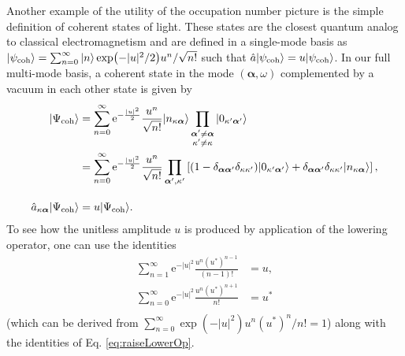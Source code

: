 \documentclass{article}
\numberwithin{equation}{section}
\begin{document}
Another example of the utility of the occupation number picture is the simple definition of coherent states of light. These states are the closest quantum analog to classical electromagnetism and are defined in a single-mode basis as $|{\psi_\mathrm{coh}}\rangle = \sum_{n = 0}^\infty|{n}\rangle\exp(-|u|^2/2)u^n/\sqrt{n!}$ such that $\hat{a}|{\psi_\mathrm{coh}}\rangle = u|{\psi_\mathrm{coh}}\rangle$. In our full multi-mode basis, a coherent state in the mode $(\bm{\alpha},\omega)$ complemented by a vacuum in each other state is given by
\begin{equation}
\begin{split}
|{\Psi_\mathrm{coh}}\rangle &= \sum_{n = 0}^\infty \mathrm{e}^{-\frac{|u|^2}{2}}\frac{u^n}{\sqrt{n!}}|{n_{\kappa\bm{\alpha}}}\rangle\prod_{\substack{\bm{\alpha}'\neq\bm{\alpha}\\\kappa'\neq\kappa}}|{0_{\kappa'\bm{\alpha}'}}\rangle\\
&=\sum_{n = 0}^\infty \mathrm{e}^{-\frac{|u|^2}{2}}\frac{u^n}{\sqrt{n!}}\prod_{\bm{\alpha}',\kappa'}\left[(1-\delta_{\bm{\alpha}\bm{\alpha}'}\delta_{\kappa\kappa'})|{0_{\kappa'\bm{\alpha}'}}\rangle + \delta_{\bm{\alpha}\bm{\alpha}'}\delta_{\kappa\kappa'}|{n_{\kappa\bm{\alpha}}}\rangle\right],\\[1.0em]
\hat{a}_{\kappa\bm{\alpha}}|{\Psi_\mathrm{coh}}\rangle &= u|{\Psi_\mathrm{coh}}\rangle.
\end{split}
\end{equation}
To see how the unitless amplitude $u$ is produced by application of the lowering operator, one can use the identities
\begin{equation}
\begin{split}
\sum_{n = 1}^\infty \mathrm{e}^{-|u|^2}\frac{u^n(u^*)^{n-1}}{(n - 1)!} &= u,\\
\sum_{n = 0}^\infty \mathrm{e}^{-|u|^2}\frac{u^n(u^*)^{n+1}}{n!} &= u^*\\
\end{split}
\end{equation}
(which can be derived from $\sum_{n = 0}^\infty\exp(-|u|^2)u^n(u^*)^n/n! = 1$) along with the identities of Eq. \eqref{eq:raiseLowerOp}.
\end{document}
